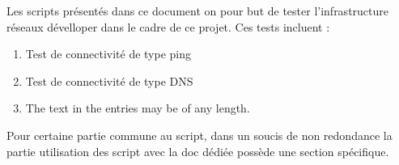 \documentclass[../file_doc_script.tex]{subfiles}
\begin{document}
Les scripts présentés dans ce document on pour but de tester l'infrastructure réseaux dévelloper 
dans le cadre de ce projet. Ces tests incluent :

\begin{enumerate}
    \item Test de connectivité de type ping
    \item Test de connectivité de type DNS
    \item The text in the entries may be of any length.
\end{enumerate}

Pour certaine partie commune au script, dans un soucis de non redondance
la partie utilisation des script avec la doc dédiée possède une section spécifique.

\newpage
\end{document}
